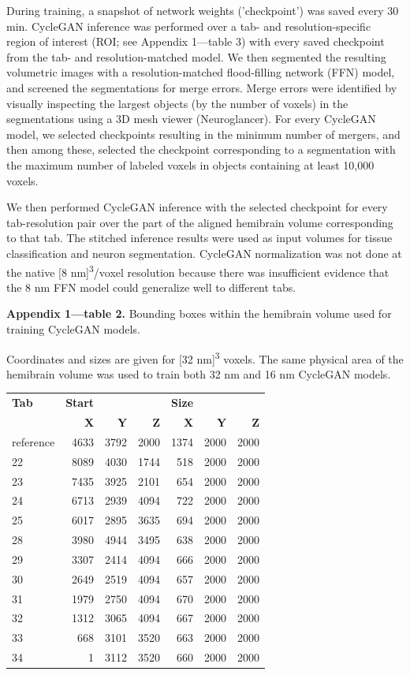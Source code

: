 \documentclass{article}
\begin{document}
During training, a snapshot of network weights (’checkpoint’) was saved every 30 min. CycleGAN inference was performed over a tab- and resolution-specific region of interest (ROI; see Appendix 1—table 3) with every saved checkpoint from the tab- and resolution-matched model. We then segmented the resulting volumetric images with a resolution-matched flood-filling network (FFN) model, and screened the segmentations for merge errors. Merge errors were identified by visually inspecting the largest objects (by the number of voxels) in the segmentations using a 3D mesh viewer (Neuroglancer). For every CycleGAN model, we selected checkpoints resulting in the minimum number of mergers, and then among these, selected the checkpoint corresponding to a segmentation with the maximum number of labeled voxels in objects containing at least 10,000 voxels.

We then performed CycleGAN inference with the selected checkpoint for every tab-resolution pair over the part of the aligned hemibrain volume corresponding to that tab. The stitched inference results were used as input volumes for tissue classification and neuron segmentation. CycleGAN normalization was not done at the native [8 nm]\textsuperscript{3}/voxel resolution because there was insufficient evidence that the 8 nm FFN model could generalize well to different tabs.

\noindent \textbf{Appendix 1—table 2.} Bounding boxes within the hemibrain volume used for training CycleGAN models.

\noindent Coordinates and sizes are given for [32 nm]\textsuperscript{3} voxels. The same physical area of the hemibrain volume was used to train both 32 nm and 16 nm CycleGAN models.
\begin{center}\footnotesize
\begin{longtable}{lrrrrrr}
\textbf{Tab} & \textbf{Start} & & & \textbf{Size} & & \\
 & \textbf{X} & \textbf{Y} & \textbf{Z} & \textbf{X} & \textbf{Y} & \textbf{Z} \\
\hline
reference & 4633 & 3792 & 2000 & 1374 & 2000 & 2000 \\
22 & 8089 & 4030 & 1744 & 518 & 2000 & 2000 \\
23 & 7435 & 3925 & 2101 & 654 & 2000 & 2000 \\
24 & 6713 & 2939 & 4094 & 722 & 2000 & 2000 \\
25 & 6017 & 2895 & 3635 & 694 & 2000 & 2000 \\
28 & 3980 & 4944 & 3495 & 638 & 2000 & 2000 \\
29 & 3307 & 2414 & 4094 & 666 & 2000 & 2000 \\
30 & 2649 & 2519 & 4094 & 657 & 2000 & 2000 \\
31 & 1979 & 2750 & 4094 & 670 & 2000 & 2000 \\
32 & 1312 & 3065 & 4094 & 667 & 2000 & 2000 \\
33 & 668 & 3101 & 3520 & 663 & 2000 & 2000 \\
34 & 1 & 3112 & 3520 & 660 & 2000 & 2000 \\
\end{longtable}
\end{center}
\end{document}
